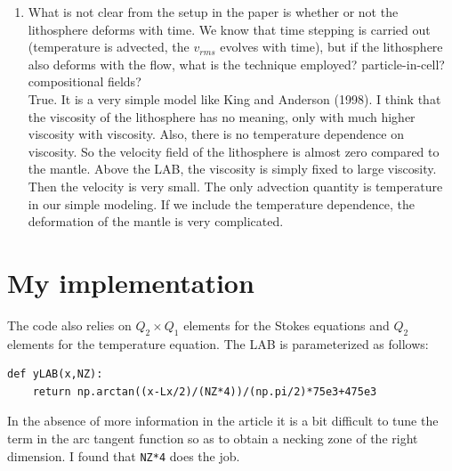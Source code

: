 \begin{enumerate}
\item What is not clear from the setup in the paper is whether or not the lithosphere 
deforms with time. We know that time stepping is carried out (temperature is advected,
the $v_{rms}$ evolves with time), but if the lithosphere also deforms with the flow, 
what is the technique employed? particle-in-cell? compositional fields? \\
{\color{darkgray}
True. It is a very simple model like King and Anderson (1998). I think that the viscosity of the lithosphere 
has no meaning, only with much higher viscosity with viscosity. Also, there is no temperature dependence 
on viscosity. So the velocity field of the lithosphere is almost zero compared to the mantle.
Above the LAB, the viscosity is simply fixed to large viscosity. Then the velocity is very small. 
The only advection quantity is temperature in our simple modeling. 
If we include the temperature dependence, the deformation of the mantle is very complicated.
}


\end{enumerate} 

\section*{My implementation}

The code also relies on $Q_2\times Q_1$ elements for the Stokes equations and 
$Q_2$ elements for the temperature equation. 
The LAB is parameterized as follows:
\begin{lstlisting}
def yLAB(x,NZ):
    return np.arctan((x-Lx/2)/(NZ*4))/(np.pi/2)*75e3+475e3
\end{lstlisting}
In the absence of more information in the article it is a bit difficult
to tune the term in the arc tangent function so as to obtain a necking zone 
of the right dimension. I found that \lstinline{NZ*4} does the job.

